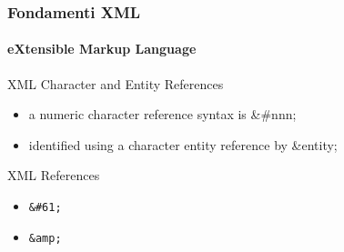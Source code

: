 
\begin{frame}
    \frametitle{Fondamenti XML}
    \framesubtitle{eXtensible Markup Language}
    \addtocounter{nframe}{1}

	\begin{block}{XML Character and Entity References}
		\begin{itemize}
			\item a numeric character reference syntax  is \&\#nnn;
			\item identified using a character entity reference by \&entity;
		\end{itemize}
	\end{block}

	\begin{block}{XML References}
		\begin{itemize}
			\item \texttt{\&\#61;}
			\item \texttt{\&amp;}
		\end{itemize}
	\end{block}

\end{frame}


